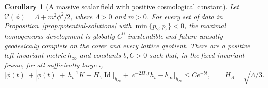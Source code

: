 \documentclass[10pt,a4paper]{article}
\numberwithin{equation}{section}
\newtheorem{corollary}[theorem]{Corollary}
\theoremstyle{definition}
\theoremstyle{remark}
\begin{document}
\begin{corollary}[A massive scalar field with positive cosmological constant]
\label{cor:massive-de-sitter-future}
Let $\mathcal V(\phi)=\Lambda+m^2\phi^2/2$, where $\Lambda>0$ and
$m>0$.  For every set of data in
Proposition~\ref{prop:potential-solutions} with
$\min\{p_2,p_3\}<0$, the maximal homogeneous development is globally
$C^0$-inextendible and future causally geodesically complete on the
cover and every lattice quotient.  There are a positive left-invariant
metric $h_\infty$ and constants $b,C>0$ such that, in the fixed invariant
frame, for all sufficiently large $t$,
\begin{equation}
 |\phi(t)|+|\dot\phi(t)|+
 \bigl|h_t^{-1}K-H_\Lambda\operatorname{Id}\bigr|_{h_\infty}
 +\bigl|e^{-2H_\Lambda t}h_t-h_\infty\bigr|_{h_\infty}
 \le Ce^{-bt},\qquad H_\Lambda=\sqrt{\Lambda/3}.
 \label{eq:massive-de-sitter-asymptotics}
\end{equation}
\end{corollary}
\end{document}
